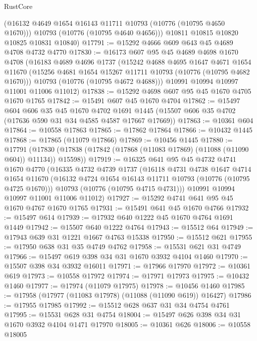 \begin{lexlean}{RustCore}
\begin{coremodule}
        (@16132 @4649 @1654 @16143 @11711 @10793 (@10776 (@10795 @4650 @1670)))
        @10793
        (@10776 (@10795 @4640 @4656)))
      @10811
      @10815
      @10820
      @10825
      @10831
      @10840)
@17791 := @15292 @4666 @609 @643 @45 @4689 @4708 @4732 @4770
@17830 := @16173
    @607
    @95
    @45
    @4689
    @4698
    @1670
    @4708
    (@16183
      @4689
      @4696
      @1737
      (@15242
        @4688
        @4695
        @1647
        @4671
        @1654
        @11670
        (@15256 @4681 @1654 @15267 @11711 @10793 (@10776 (@10795 @4682 @1670)))
        @10793
        (@10776 (@10795 @4672 @4688)))
      @10991
      @10994
      @10997
      @11001
      @11006
      @11012)
@17838 := @15292 @4698 @607 @95 @45 @1670 @4705 @1670 @1765
@17842 := @15491 @607 @45 @1670 @4704
@17862 := @15497
    @604
    @606
    @35
    @45
    @1670
    @4702
    @1691
    @1445
    (@15507 @606 @35 @4702 (@17636 @590 @31 @34 @4585 @4587 @17667 @17669))
@17863 := @10361 @604
@17864 := @10558 @17863
@17865 := @17862 @17864
@17866 := @10432 @1445
@17868 := @17865 (@11079 @17866)
@17869 := @10456 @1445
@17880 := @17791
    (@17830 (@17838 (@17842 (@17868 (@11083 @17869) (@11088 (@11090 @604)) @11134)) @15598))
@17919 := @16325
    @641
    @95
    @45
    @4732
    @4741
    @1670
    @4770
    (@16335
      @4732
      @4739
      @1737
      (@16118
        @4731
        @4738
        @1647
        @4714
        @1654
        @11670
        (@16132 @4724 @1654 @16143 @11711 @10793 (@10776 (@10795 @4725 @1670)))
        @10793
        (@10776 (@10795 @4715 @4731)))
      @10991
      @10994
      @10997
      @11001
      @11006
      @11012)
@17927 := @15292 @4741 @641 @95 @45 @1670 @4767 @1670 @1765
@17931 := @15491 @641 @45 @1670 @4766
@17932 := @15497 @614
@17939 := @17932 @640 @1222 @45 @1670 @4764 @1691 @1449
@17942 := @15507 @640 @1222 @4764
@17943 := @15512 @64
@17949 := @17943 @639 @31 @1221 @1667 @4763 @15338
@17950 := @15512 @621
@17955 := @17950 @638 @31 @35 @4749 @4762
@17958 := @15531 @621 @31 @4749
@17966 := @15497 @619 @398 @34 @31 @1670 @3932 @4104 @1460
@17970 := @15507 @398 @34 @3932 @16011
@17971 := @17966 @17970
@17972 := @10361 @619
@17973 := @10558 @17972
@17974 := @17971 @17973
@17975 := @10432 @1460
@17977 := @17974 (@11079 @17975)
@17978 := @10456 @1460
@17985 := @17958 (@17977 (@11083 @17978) (@11088 (@11090 @619)) @16427)
@17986 := @17955 @17985
@17992 := @15512 @628 @637 @31 @34 @4754 @4761
@17995 := @15531 @628 @31 @4754
@18004 := @15497 @626 @398 @34 @31 @1670 @3932 @4104 @1471 @17970
@18005 := @10361 @626
@18006 := @10558 @18005

\end{coremodule}
\end{lexlean}
